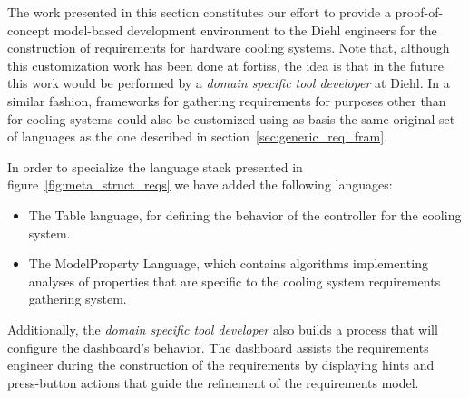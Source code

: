 The work presented in this section constitutes our effort to provide
a proof-of-concept model-based development environment to the Diehl engineers
for the construction of requirements for hardware cooling systems.
Note that, although this customization work has been done at fortiss, the idea
is that in the future this work would be performed by a \emph{domain specific tool
developer} at Diehl. In a similar fashion, frameworks for gathering requirements for purposes
other than for cooling systems could also be customized using as basis the same
original set of languages as the one described in
section~\ref{sec:generic_req_fram}.


In order to specialize the language stack presented in
figure~\ref{fig:meta_struct_reqs} we have added the following languages:


\begin{itemize}
  \item The \textsf{Table} language, for defining the behavior of the
  controller for the cooling system.
  \item The \textsf{ModelProperty} Language, which contains algorithms
  implementing analyses of properties that are specific to the cooling system requirements gathering system.
\end{itemize}

Additionally, the \emph{domain specific tool developer} also builds a process
that will configure the dashboard's behavior. The dashboard assists the requirements engineer during
the construction of the requirements by displaying hints and press-button
actions that guide the refinement of the requirements model.

